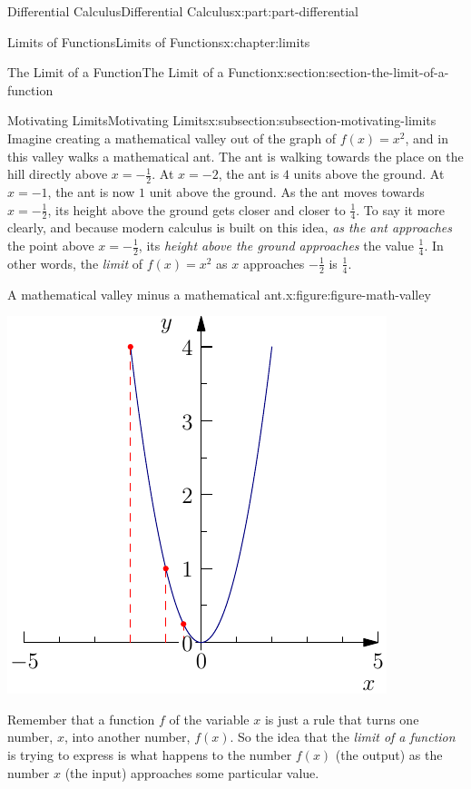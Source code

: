 \documentclass[twoside,10pt,]{book}
\numberwithin{equation}{part}
\begin{document}
\begin{partptx}{Differential Calculus}{}{Differential Calculus}{}{}{x:part:part-differential}
\begin{chapterptx}{Limits of Functions}{}{Limits of Functions}{}{}{x:chapter:limits}
\begin{sectionptx}{The Limit of a Function}{}{The Limit of a Function}{}{}{x:section:section-the-limit-of-a-function}
\begin{subsectionptx}{Motivating Limits}{}{Motivating Limits}{}{}{x:subsection:subsection-motivating-limits}
Imagine creating a mathematical valley out of the graph of \(f(x) = x^{2}\), and in this valley walks a mathematical ant. The ant is walking towards the place on the hill directly above \(x = -\frac{1}{2}\). At \(x=-2\), the ant is \(4\) units above the ground. At \(x=-1\), the ant is now \(1\) unit above the ground. As the ant moves towards \(x=-\frac{1}{2}\), its height above the ground gets closer and closer to \(\frac{1}{4}\). To say it more clearly, and because modern calculus is built on this idea, \emph{as the ant approaches} the point above \(x = -\frac{1}{2}\), its \emph{height above the ground approaches} the value \(\frac{1}{4}\). In other words, the \emph{limit} of \(f(x) = x^{2}\) as \(x\) approaches \(-\frac{1}{2}\) is \(\frac{1}{4}\).%
\begin{figureptx}{A mathematical valley minus a mathematical ant.}{x:figure:figure-math-valley}{}%
\begin{image}{0.25}{0.5}{0.25}%
\includegraphics[width=\linewidth]{generated/asymptote/image-1.pdf}
\end{image}%
\tcblower
\end{figureptx}%
Remember that a function \(f\) of the variable \(x\) is just a rule that turns one number, \(x\), into another number, \(f(x)\). So the idea that the \emph{limit of a function} is trying to express is what happens to the number \(f(x)\) (the output) as the number \(x\) (the input) approaches some particular value.%

\end{subsectionptx}
\end{sectionptx}
\end{chapterptx}
\end{partptx}
\end{document}
